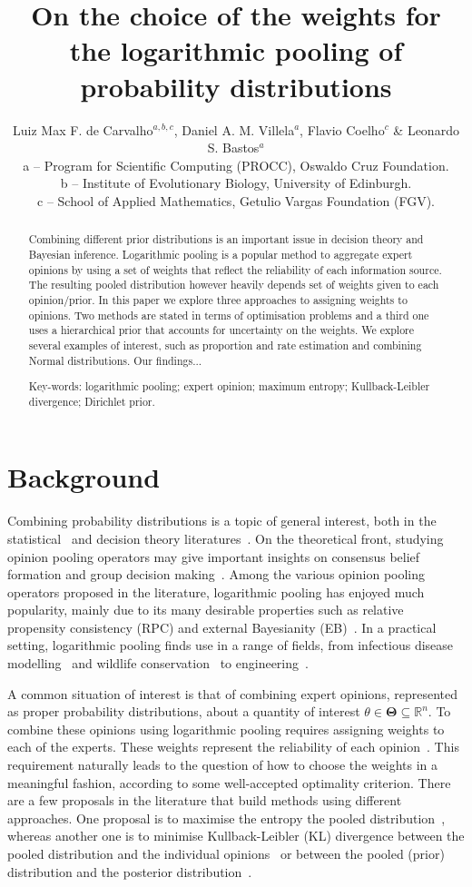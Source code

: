 \documentclass[a4paper, notitlepage, 11pt]{article}
\title{\vspace{-9ex}\centering \bf On the choice of the weights for the logarithmic pooling of probability distributions}
\author{
Luiz Max F. de Carvalho$^{a,b,c}$, Daniel A. M. Villela$^a$, Flavio Coelho$^c$ \& Leonardo S. Bastos$^a$ \\
a -- Program for Scientific Computing (PROCC), Oswaldo Cruz Foundation. \\
b -- Institute of Evolutionary Biology, University of Edinburgh.\\
c -- School of Applied Mathematics, Getulio Vargas Foundation (FGV).
}
\begin{document}
\maketitle

\begin{abstract}
Combining different prior distributions is an important issue in decision theory and Bayesian inference.
Logarithmic pooling is a popular method to aggregate expert opinions by using a set of weights that reflect the reliability of each information source.
The resulting pooled distribution however heavily depends set of weights given to each opinion/prior.
In this paper we explore three approaches to assigning weights to opinions.
Two methods are stated in terms of optimisation problems and a third one uses a hierarchical prior that accounts for uncertainty on the weights. 
We explore several examples of interest, such as proportion and rate estimation and combining Normal distributions.
Our findings...

Key-words: logarithmic pooling; expert opinion; maximum entropy; Kullback-Leibler divergence; Dirichlet prior. 
\end{abstract}

\section*{Background}

Combining probability distributions is a topic of general interest, both in the statistical~\citep{genest1986A,genest1986B} and decision theory literatures~\citep{genest1984}.
On the theoretical front, studying opinion pooling operators may give important insights on consensus belief formation and group decision making~\citep{genest1986B}.
Among the various opinion pooling operators proposed in the literature, logarithmic pooling has enjoyed much popularity, mainly due to its many desirable properties such as relative propensity consistency (RPC) and external Bayesianity (EB)~\citep{genest1986A}. 
In a practical setting, logarithmic pooling finds use in a range of fields, from infectious disease modelling~\citep{Coelho2009} and wildlife conservation~\citep{poole2000} to engineering~\citep{lind1988, savchuk1994}.

A common situation of interest is that of combining expert opinions, represented as proper probability distributions, about a quantity of interest $\theta \in \mathbf{\Theta} \subseteq \mathbb{R}^n$.
To combine these opinions using logarithmic pooling requires assigning weights to each of the experts.
These weights represent the reliability of each opinion~\citep{genest1984}.
This requirement naturally leads to the question of how to choose the weights in a meaningful fashion, according to some well-accepted optimality criterion.
There are a few proposals in the literature that build methods using different approaches.
One proposal is to maximise the entropy the pooled distribution~\citep{myung1996}, whereas another one is to minimise Kullback-Leibler (KL) divergence between the pooled distribution and the individual opinions~\citep{abbas2009} or between the pooled (prior) distribution and the posterior distribution~\citep{rufo2012A,rufo2012B}.
\end{document}
